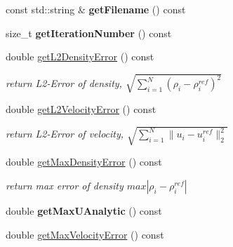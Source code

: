 \begin{DoxyCompactItemize}
\item 
\hypertarget{classnatrium_1_1ErrorStats_a341ef071a84aa3a2b78485ce90bca7b2}{const std\-::string \& {\bfseries get\-Filename} () const }\label{classnatrium_1_1ErrorStats_a341ef071a84aa3a2b78485ce90bca7b2}

\item 
\hypertarget{classnatrium_1_1ErrorStats_ab710182a15d0c548fbc8c3b071dbebd1}{size\-\_\-t {\bfseries get\-Iteration\-Number} () const }\label{classnatrium_1_1ErrorStats_ab710182a15d0c548fbc8c3b071dbebd1}

\item 
double \hyperlink{classnatrium_1_1ErrorStats_a66f817c7daaf15724d5d42de4f17a1e8}{get\-L2\-Density\-Error} () const 
\begin{DoxyCompactList}\small\item\em return L2-\/\-Error of density, $ \sqrt{ \sum_{i=1}^{N} (\rho_{i} - \rho_{i}^{ref})^{2} } $ \end{DoxyCompactList}\item 
double \hyperlink{classnatrium_1_1ErrorStats_a201f625a3607a814fdd645aabfe37fbc}{get\-L2\-Velocity\-Error} () const 
\begin{DoxyCompactList}\small\item\em return L2-\/\-Error of velocity, $ \sqrt{ \sum_{i=1}^{N} \|u_{i} - u_{i}^{ref}\|_{2}^{2} } $ \end{DoxyCompactList}\item 
\hypertarget{classnatrium_1_1ErrorStats_a8e32b3e8c8d141b6cdcf5428613a875e}{double \hyperlink{classnatrium_1_1ErrorStats_a8e32b3e8c8d141b6cdcf5428613a875e}{get\-Max\-Density\-Error} () const }\label{classnatrium_1_1ErrorStats_a8e32b3e8c8d141b6cdcf5428613a875e}

\begin{DoxyCompactList}\small\item\em return max error of density $ max | \rho_{i} - \rho_{i}^{ref} | $ \end{DoxyCompactList}\item 
\hypertarget{classnatrium_1_1ErrorStats_a350f6b6fcc91f18006095331b0aa430c}{double {\bfseries get\-Max\-U\-Analytic} () const }\label{classnatrium_1_1ErrorStats_a350f6b6fcc91f18006095331b0aa430c}

\item 
\hypertarget{classnatrium_1_1ErrorStats_a48ea1bfc5db4dad6369b4b2991aa1f5c}{double \hyperlink{classnatrium_1_1ErrorStats_a48ea1bfc5db4dad6369b4b2991aa1f5c}{get\-Max\-Velocity\-Error} () const }\label{classnatrium_1_1ErrorStats_a48ea1bfc5db4dad6369b4b2991aa1f5c}


\end{DoxyCompactItemize}

